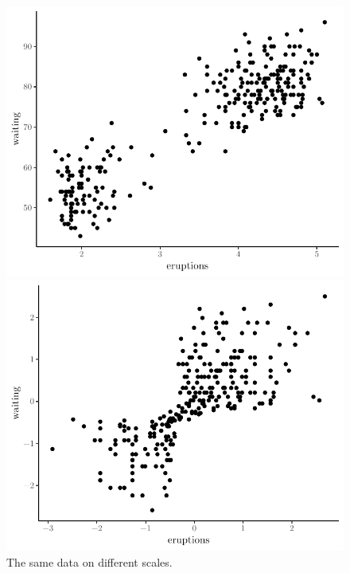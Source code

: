 \begin{figure}[t]
    \centering
    \begin{minipage}[t]{0.48\textwidth}
      \includegraphics[width=\textwidth]{faithful}
    \end{minipage}
    \begin{minipage}[t]{0.48\textwidth}
      \includegraphics[width=\textwidth]{faithful-transformed}
    \end{minipage}
    \caption{The same data on different scales.}
    \label{fig:faithful}
  \end{figure}


